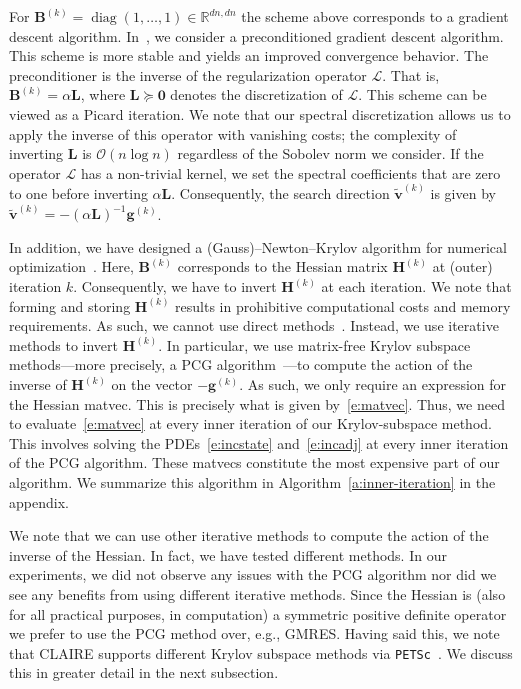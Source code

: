 \documentclass[11pt]{amsart}
\newcommand{\algref}[1]{Algorithm~\ref{#1}}
\newcommand\di[1]{\ensuremath{\mathbf{#1}}}
\begin{document}
For $\di{B}^{(k)} = \operatorname{diag}(1,\ldots,1) \in \mathbb{R}^{dn,dn}$ the scheme above corresponds to a gradient descent algorithm. In~\cite{Mang:2015a}, we consider a preconditioned gradient descent algorithm. This scheme is more stable and yields an improved convergence behavior. The preconditioner is the inverse of the regularization operator $\mathcal{L}$. That is, $\di{B}^{(k)} = \alpha\di{L}$, where $\di{L} \succeq \di{0}$ denotes the discretization of $\mathcal{L}$. This scheme can be viewed as a Picard iteration. We note that our spectral discretization allows us to apply the inverse of this operator with vanishing costs; the complexity of inverting $\di{L}$ is $\mathcal{O}(n \log n)$ regardless of the Sobolev norm we consider. If the operator $\mathcal{L}$ has a non-trivial kernel, we set the spectral coefficients that are zero to one before inverting $\alpha\di{L}$. Consequently, the search direction $\di{\tilde{v}}^{(k)}$ is given by $\di{\tilde{v}}^{(k)} = -(\alpha\di{L})^{-1} \di{g}^{(k)}$.

In addition, we have designed a (Gauss)--Newton--Krylov algorithm for numerical optimization~\cite{Mang:2015a,Mang:2019a}. Here, $\di{B}^{(k)}$ corresponds to the Hessian matrix $\di{H}^{(k)}$ at (outer) iteration $k$. Consequently, we have to invert $\di{H}^{(k)}$ at each iteration. We note that forming and storing $\di{H}^{(k)}$ results in prohibitive computational costs and memory requirements. As such, we cannot use direct methods~\cite{Duff:2017a,Davis:2006a}. Instead, we use iterative methods to invert $\di{H}^{(k)}$. In particular, we use matrix-free Krylov subspace methods---more precisely, a PCG algorithm~\cite{Hestenes:1952a}---to compute the action of the inverse of $\di{H}^{(k)}$ on the vector $-\di{g}^{(k)}$. As such, we only require an expression for the Hessian matvec. This is precisely what is given by~\eqref{e:matvec}. Thus, we need to evaluate~\eqref{e:matvec} at every inner iteration of our Krylov-subspace method. This involves solving the PDEs~\eqref{e:incstate} and~\eqref{e:incadj} at every inner iteration of the PCG algorithm. These matvecs constitute the most expensive part of our algorithm. We summarize this algorithm in \algref{a:inner-iteration} in the appendix.

We note that we can use other iterative methods to compute the action of the inverse of the Hessian. In fact, we have tested different methods. In our experiments, we did not observe any issues with the PCG algorithm nor did we see any benefits from using different iterative methods. Since the Hessian is (also for all practical purposes, in computation) a symmetric positive definite operator we prefer to use the PCG method over, e.g., GMRES. Having said this, we note that CLAIRE supports different Krylov subspace methods via \texttt{PETSc}~\cite{petsc-user-ref,petsc-web-page}. We discuss this in greater detail in the next subsection.
\end{document}
